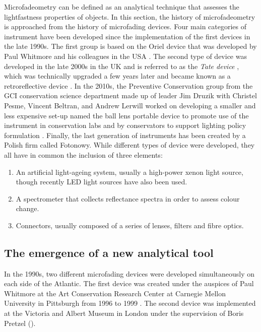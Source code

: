 Microfadeometry can be defined as an analytical technique that assesses the lightfastness properties of objects. In this section, the history of microfadeometry is approached from the history of microfading devices. Four main categories of instrument have been developed since the implementation of the first devices in the late 1990s. The first group is based on the Oriel device that was developed by Paul Whitmore and his colleagues in the \gls{USA} \citep{whitmore_predicting_1999}. The second type of device was developed in the late 2000s in the \gls{UK} and is referred to as the \textit{Tate device} \citep{lerwill_versatile_2007}, which was technically upgraded a few years later and became known as a retroreflective device \citep{liang_development_2011}. In the 2010s, the Preventive Conservation group from the GCI conservation science department made up of leader Jim Druzik with Christel Pesme, Vincent Beltran, and Andrew Lerwill worked on developing a smaller and less expensive set-up named the ball lens portable device to promote use of the instrument in conservation labs and by conservators to support lighting policy formulation \citep{pesme_development_2016}. Finally, the last generation of instruments has been created by a Polish firm called Fotonowy. While different types of device were developed, they all have in common the inclusion of three elements:
\begin{enumerate}
    \item An artificial light-ageing system, usually a high-power xenon light source, though recently \gls{LED} light sources have also been used.
    \item A spectrometer that collects reflectance spectra in order to assess colour change.
    \item Connectors, usually composed of a series of lenses, filters and fibre optics. 
\end{enumerate}


\subsection{The emergence of a new analytical tool}

In the 1990s, two different microfading devices were developed simultaneously on each side of the Atlantic. The first device was created under the auspices of Paul Whitmore at the Art Conservation Research Center at Carnegie Mellon University in Pittsburgh from 1996 to 1999 \citep{whitmore_predicting_1999}. The second device was implemented at the Victoria and Albert Museum in London under the supervision of Boris Pretzel (\citeyear{pretzel_determining_2000}).\\

